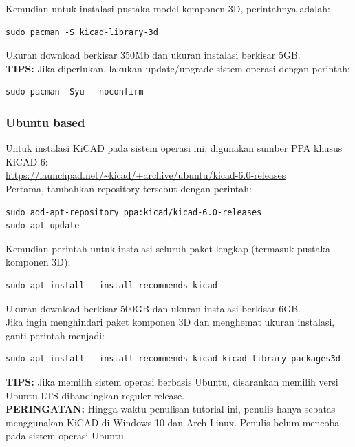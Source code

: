 \documentclass[12pt]{book}
\begin{document}
	Kemudian untuk instalasi pustaka model komponen 3D, perintahnya adalah:

	\begin{lstlisting}
sudo pacman -S kicad-library-3d
	\end{lstlisting}

	Ukuran download berkisar 350Mb dan ukuran instalasi berkisar 5GB.\\

	\textbf{TIPS:} Jika diperlukan, lakukan update/upgrade sistem operasi dengan perintah:

	\begin{lstlisting}
sudo pacman -Syu --noconfirm
	\end{lstlisting}

	\subsubsection{Ubuntu based}

	Untuk instalasi KiCAD pada sistem operasi ini, digunakan sumber PPA khusus KiCAD 6:\\
	\url{https://launchpad.net/~kicad/+archive/ubuntu/kicad-6.0-releases} \\

	Pertama, tambahkan repository tersebut dengan perintah:
	\begin{lstlisting}
sudo add-apt-repository ppa:kicad/kicad-6.0-releases
sudo apt update
	\end{lstlisting}

	Kemudian perintah untuk instalasi seluruh paket lengkap (termasuk pustaka komponen 3D):
	\begin{lstlisting}
sudo apt install --install-recommends kicad
	\end{lstlisting}
	Ukuran download berkisar 500GB dan ukuran instalasi berkisar 6GB.\\

	Jika ingin menghindari paket komponen 3D dan menghemat ukuran instalasi, ganti perintah menjadi:

	\begin{lstlisting}
sudo apt install --install-recommends kicad kicad-library-packages3d-
	\end{lstlisting}

	\textbf{TIPS:} Jika memilih sistem operasi berbasis Ubuntu, disarankan memilih versi Ubuntu LTS dibandingkan
	reguler release.\\

	\textbf{PERINGATAN:} Hingga waktu penulisan tutorial ini, penulis hanya sebatas menggunakan
	KiCAD di Windows 10 dan Arch-Linux.
	Penulis belum mencoba pada sistem operasi Ubuntu.
\end{document}
